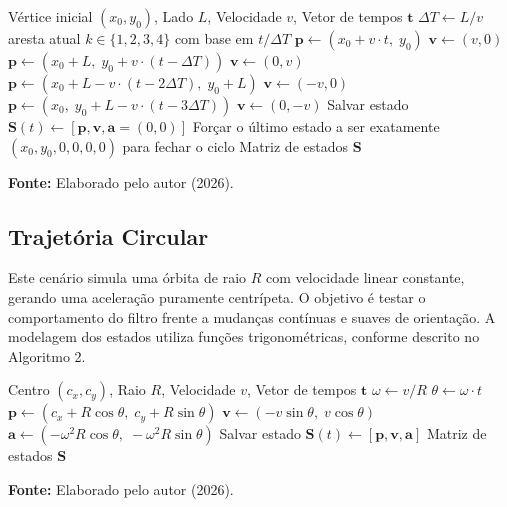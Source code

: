 \documentclass[journal]{IEEEtran}
\begin{document}
\begin{algorithm}[H]
\caption{Trajetória Quadrada}
\begin{algorithmic}[1]
\Require Vértice inicial $(x_0, y_0)$, Lado $L$, Velocidade $v$, Vetor de tempos $\mathbf{t}$
\State $\Delta T \gets L / v$ 
    \State aresta atual $k \in \{1, 2, 3, 4\}$ com base em $t / \Delta T$
        \State $\mathbf{p} \gets (x_0 + v \cdot t, \; y_0)$
        \State $\mathbf{v} \gets (v, 0)$
        \State $\mathbf{p} \gets (x_0 + L, \; y_0 + v \cdot (t - \Delta T))$
        \State $\mathbf{v} \gets (0, v)$
        \State $\mathbf{p} \gets (x_0 + L - v \cdot (t - 2\Delta T), \; y_0 + L)$
        \State $\mathbf{v} \gets (-v, 0)$
        \State $\mathbf{p} \gets (x_0, \; y_0 + L - v \cdot (t - 3\Delta T))$
        \State $\mathbf{v} \gets (0, -v)$
    \EndIf
    \State Salvar estado $\mathbf{S}(t) \gets [\mathbf{p}, \mathbf{v}, \mathbf{a}=(0,0)]$
\EndFor
\State Forçar o último estado a ser exatamente $(x_0, y_0, 0, 0, 0, 0)$ para fechar o ciclo
\State \Return Matriz de estados $\mathbf{S}$
\end{algorithmic}
\vspace{4pt}
    \centerline{\footnotesize \textbf{Fonte:} Elaborado pelo autor (2026).}
\end{algorithm}

\subsection{Trajetória Circular}

Este cenário simula uma órbita de raio $R$ com velocidade linear constante, gerando uma aceleração puramente centrípeta. O objetivo é testar o comportamento do filtro frente a mudanças contínuas e suaves de orientação. A modelagem dos estados utiliza funções trigonométricas, conforme descrito no Algoritmo 2.

\begin{algorithm}[H]
\caption{Trajetória Circular}
\begin{algorithmic}[1]
\Require Centro $(c_x, c_y)$, Raio $R$, Velocidade $v$, Vetor de tempos $\mathbf{t}$
\State $\omega \gets v / R$ 
    \State $\theta \gets \omega \cdot t$
    \State $\mathbf{p} \gets (c_x + R\cos\theta, \; c_y + R\sin\theta)$ 
    \State $\mathbf{v} \gets (-v\sin\theta, \; v\cos\theta)$ 
    \State $\mathbf{a} \gets (-\omega^2 R\cos\theta, \; -\omega^2 R\sin\theta)$ 
    \State Salvar estado $\mathbf{S}(t) \gets [\mathbf{p}, \mathbf{v}, \mathbf{a}]$
\EndFor
\State \Return Matriz de estados $\mathbf{S}$
\end{algorithmic}
\vspace{4pt}
    \centerline{\footnotesize \textbf{Fonte:} Elaborado pelo autor (2026).}
\end{algorithm}
\end{document}
